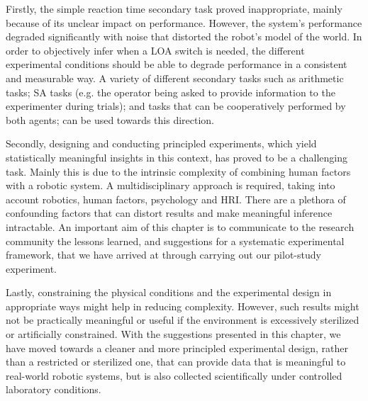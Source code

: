 \documentclass[a4paper,12pt,oneside,openright]{bhamthesis}
\begin{document}
Firstly, the simple reaction time secondary task proved inappropriate, mainly because of its unclear impact on performance. However, the system's performance degraded significantly with noise that distorted the robot's model of the world. In order to objectively infer when a LOA switch is needed, the different experimental conditions should be able to degrade performance in a consistent and measurable way. A variety of different secondary tasks such as arithmetic tasks; SA tasks (e.g. the operator being asked to provide information to the experimenter during trials); and tasks that can be cooperatively performed by both agents; can be used towards this direction.

Secondly, designing and conducting principled experiments, which yield statistically meaningful insights in this context, has proved to be a challenging task. Mainly this is due to the intrinsic complexity of combining human factors with a robotic system. A multidisciplinary approach is required, taking into account robotics, human factors, psychology and HRI. There are a plethora of confounding factors that can distort results and make meaningful inference intractable. An important aim of this chapter is to communicate to the research community the lessons learned, and suggestions for a systematic experimental framework, that we have arrived at through carrying out our pilot-study experiment.

Lastly, constraining the physical conditions and the experimental design in appropriate ways might help in reducing complexity. However, such results might not be practically meaningful or useful if the environment is excessively sterilized or artificially constrained. With the suggestions presented in this chapter, we have moved towards a cleaner and more principled experimental design, rather than a restricted or sterilized one, that can provide data that is meaningful to real-world robotic systems, but is also collected scientifically under controlled laboratory conditions.
\end{document}
